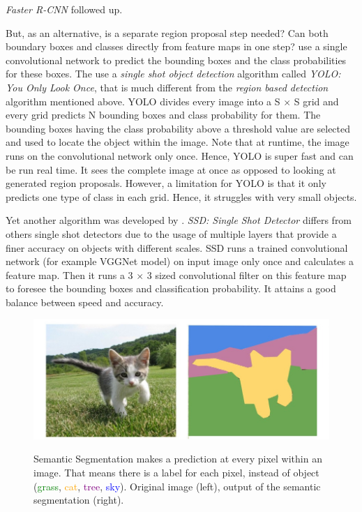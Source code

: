 \documentclass[12pt,a4paper]{report}
\newcommand{\term}{\textit}
\newcommand{\acronym}{\MakeUppercase}
\begin{document}
	\term{Faster \acronym{r-cnn}} followed up.
	\par
	But, as an alternative, is a separate region proposal step needed? Can both boundary 
	boxes and classes directly from feature maps in one step? \citet{Redmon} use a single 
	convolutional network to predict the bounding boxes and the class probabilities for 
	these boxes. The use a \term{single shot object detection} algorithm called 
	\term{\acronym{yolo}: You Only Look Once}, that is much different from the 
	\term{region based detection} algorithm mentioned above. \acronym{yolo} divides every 
	image into a S $\times$ S grid and every grid predicts N bounding boxes and class 
	probability for them. The bounding boxes having the class probability above a threshold 
	value are selected and used to locate the object within the image. Note that at runtime, 
	the image runs on the convolutional network only once. Hence, \acronym{yolo} is super 
	fast and can be run real time. It sees the complete image at once as opposed to looking 
	at generated region proposals. However, a limitation for \acronym{yolo} is that it only 
	predicts one type of class in each grid. Hence, it struggles with very small objects.
	\par
	Yet another algorithm was developed by \citet{Liu}. \term{\acronym{ssd}: Single Shot 
	Detector} differs from others single shot detectors due to the usage of multiple layers 
	that provide a finer accuracy on objects with different scales. \acronym{ssd} runs a 
	trained convolutional network (for example VGGNet model) on input image only once and 
	calculates a feature map. Then it runs a 3 $\times$ 3 sized convolutional filter on 
	this feature map to foresee the bounding boxes and classification probability. It 
	attains a good balance between speed and accuracy.
	\\
	
	\begin{figure}[h!]
		\caption{Semantic Segmentation makes a prediction at every pixel within an image. 
		That means there is a label for each pixel, instead of object (\textcolor{green}{grass}, \textcolor{orange}{cat}, \textcolor{purple}{tree}, \textcolor{blue}{sky}). Original 
		image (left), output of the semantic segmentation (right).}
		\centering
		\includegraphics[width=\textwidth]{segm}
		\label{fig:segm}
	\end{figure}
	
\end{document}
